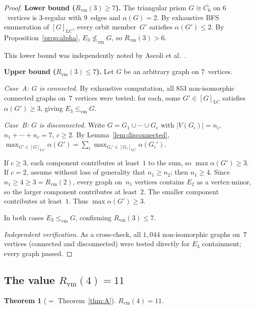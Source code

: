 \documentclass[11pt]{amsart}
\newtheorem{theorem}{Theorem}[section]
\theoremstyle{definition}
\theoremstyle{remark}
\newcommand{\Rvm}{R_{\mathrm{vm}}}
\newcommand{\LC}{\mathrm{LC}}
\newcommand{\vm}{\leq_{\mathrm{vm}}}
\begin{document}
\begin{proof}
  \textbf{Lower bound ($\Rvm(3)\geq 7$).}
  The triangular prism $G\cong\overline{C_6}$ on $6$~vertices is
  $3$-regular with $9$~edges and $\alpha(G)=2$.  By exhaustive BFS
  enumeration of $[G]_{\LC}$, every orbit member~$G'$ satisfies
  $\alpha(G')\leq 2$.  By Proposition~\ref{prop:alpha},
  $E_3\not\vm G$, so $\Rvm(3)>6$.

  This lower bound was independently noted by Ascoli et
  al.~\cite{AFFMP2026}.

  \smallskip
  \textbf{Upper bound ($\Rvm(3)\leq 7$).}
  Let $G$ be an arbitrary graph on $7$~vertices.

  \emph{Case~A: $G$ is connected.}
  By exhaustive computation, all $853$ non-isomorphic connected graphs
  on~$7$ vertices were tested: for each, some $G'\in[G]_{\LC}$ satisfies
  $\alpha(G')\geq 3$, giving $E_3\vm G$.

  \emph{Case~B: $G$ is disconnected.}
  Write $G=G_1\cup\cdots\cup G_c$ with $|V(G_i)|=n_i$,
  $n_1+\cdots+n_c=7$, $c\geq 2$.  By Lemma~\ref{lem:disconnected},
  $\max_{G'\in[G]_{\LC}}\alpha(G') = \sum_i
  \max_{G_i'\in[G_i]_{\LC}}\alpha(G_i')$.

  If $c\geq 3$, each component contributes at least~$1$ to the sum, so
  $\max\alpha(G')\geq 3$.  If $c=2$, assume without loss of generality
  that $n_1\geq n_2$; then $n_1\geq 4$.  Since
  $n_1\geq 4\geq 3=\Rvm(2)$, every
  graph on~$n_1$ vertices contains $E_2$ as a vertex-minor, so the
  larger component contributes at least~$2$.  The smaller component
  contributes at least~$1$.  Thus $\max\alpha(G')\geq 3$.

  In both cases $E_3\vm G$, confirming $\Rvm(3)\leq 7$.

  \smallskip
  \emph{Independent verification.}
  As a cross-check, all $1{,}044$ non-isomorphic graphs on~$7$ vertices
  (connected and disconnected) were tested directly for $E_3$
  containment; every graph passed.
\end{proof}


\subsection{The value $\Rvm(4)=11$}

\begin{theorem}[{$=$ Theorem~\ref{thm:A}}]\label{thm:main}
  $\Rvm(4) = 11$.
\end{theorem}
\end{document}
